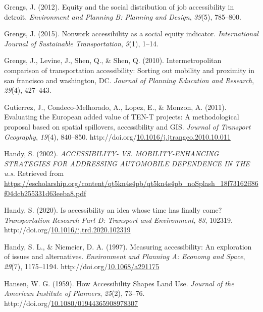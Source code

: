 \documentclass[
11pt, %
oneside, %
english, %
singlespacing, %
]{macthesis} %
\newlength{\cslhangindent}
\newenvironment{CSLReferences}[2] %
{\begin{list}{}{%
	\setlength{\itemindent}{0pt}
	\setlength{\leftmargin}{0pt}
	\setlength{\parsep}{0pt}
	\ifodd #1
	\setlength{\leftmargin}{\cslhangindent}
	\setlength{\itemindent}{-1\cslhangindent}
	\fi
	\setlength{\itemsep}{#2\baselineskip}}}
{\end{list}}
\begin{document}
\begin{CSLReferences}{1}{0}
Grengs, J. (2012). Equity and the social distribution of job accessibility in detroit. \emph{Environment and Planning B: Planning and Design}, \emph{39}(5), 785--800.

Grengs, J. (2015). Nonwork accessibility as a social equity indicator. \emph{International Journal of Sustainable Transportation}, \emph{9}(1), 1--14.

Grengs, J., Levine, J., Shen, Q., \& Shen, Q. (2010). Intermetropolitan comparison of transportation accessibility: Sorting out mobility and proximity in san francisco and washington, DC. \emph{Journal of Planning Education and Research}, \emph{29}(4), 427--443.

Gutierrez, J., Condeco-Melhorado, A., Lopez, E., \& Monzon, A. (2011). Evaluating the {European} added value of {TEN}-{T} projects: A methodological proposal based on spatial spillovers, accessibility and {GIS}. \emph{Journal of Transport Geography}, \emph{19}(4), 840--850. http://doi.org/\href{https://doi.org/10.1016/j.jtrangeo.2010.10.011}{10.1016/j.jtrangeo.2010.10.011}

Handy, S. (2002). \emph{{ACCESSIBILITY}- {VS}. {MOBILITY}-{ENHANCING} {STRATEGIES} {FOR} {ADDRESSING} {AUTOMOBILE} {DEPENDENCE} {IN} {THE} u.s.} Retrieved from \url{https://escholarship.org/content/qt5kn4s4pb/qt5kn4s4pb_noSplash_18f73162ff86f04dcb255331d63eeba8.pdf}

Handy, S. (2020). Is accessibility an idea whose time has finally come? \emph{Transportation Research Part D: Transport and Environment}, \emph{83}, 102319. http://doi.org/\href{https://doi.org/10.1016/j.trd.2020.102319}{10.1016/j.trd.2020.102319}

Handy, S. L., \& Niemeier, D. A. (1997). Measuring accessibility: An exploration of issues and alternatives. \emph{Environment and Planning A: Economy and Space}, \emph{29}(7), 1175--1194. http://doi.org/\href{https://doi.org/10.1068/a291175}{10.1068/a291175}

Hansen, W. G. (1959). How Accessibility Shapes Land Use. \emph{Journal of the American Institute of Planners}, \emph{25}(2), 73--76. http://doi.org/\href{https://doi.org/10.1080/01944365908978307}{10.1080/01944365908978307}


\end{CSLReferences}
\end{document}

